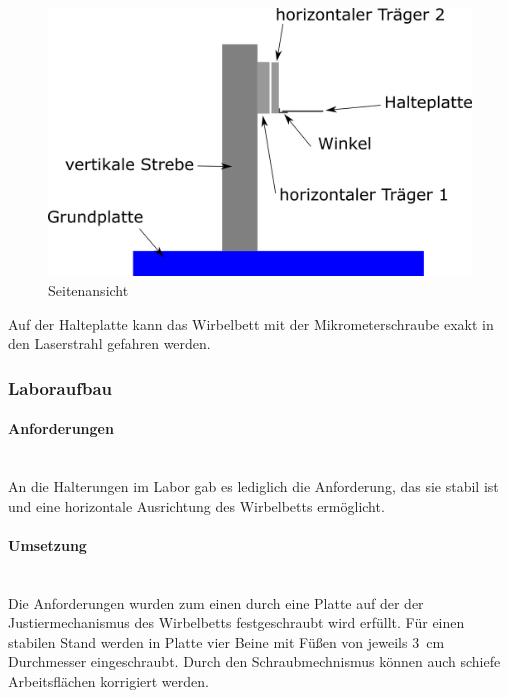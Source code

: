 \begin{figure}[h]
		\centering
		\includegraphics[scale=0.8]{Halterung_Lichtstreu_Seite.png}
		\caption[Haltearm Lichtstreuaufbau Seitenansicht]{Seitenansicht}
\end{figure}

 Auf der Halteplatte kann das Wirbelbett mit der Mikrometerschraube exakt in den Laserstrahl gefahren werden.


\subsubsection{Laboraufbau}

\paragraph{Anforderungen}
\hfill \\
An die Halterungen im Labor gab es lediglich die Anforderung, das sie stabil ist und eine horizontale Ausrichtung des Wirbelbetts ermöglicht.

\paragraph{Umsetzung}
\hfill \\
Die Anforderungen wurden zum einen durch eine Platte auf der der Justiermechanismus des Wirbelbetts festgeschraubt wird erfüllt. Für einen stabilen Stand werden in Platte vier Beine mit Füßen von jeweils \SI{3}{cm} Durchmesser eingeschraubt. Durch den Schraubmechnismus können auch schiefe Arbeitsflächen korrigiert werden.



